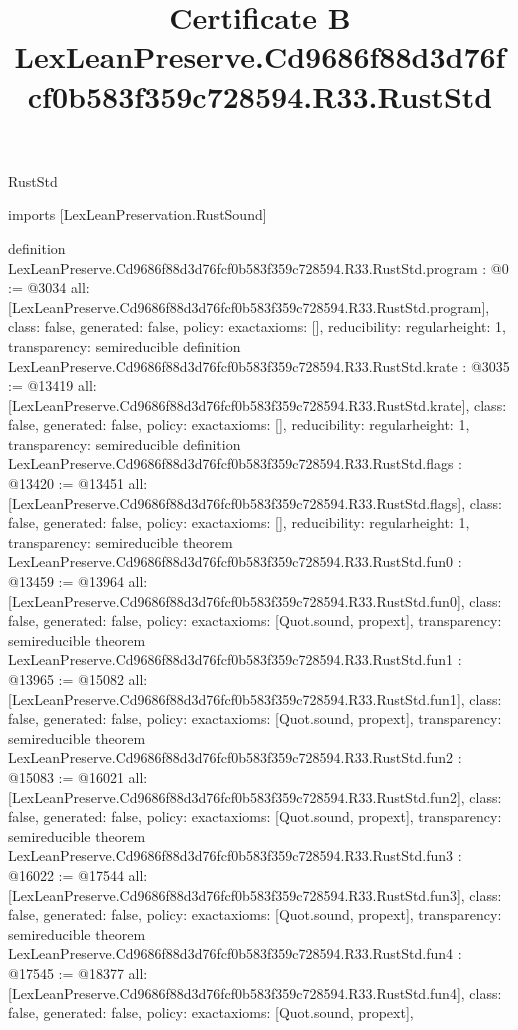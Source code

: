 \begin{lexlean}{RustStd}
\title{Certificate B LexLeanPreserve.Cd9686f88d3d76fcf0b583f359c728594.R33.RustStd}
\begin{coremodule}
imports [LexLeanPreservation.RustSound]

definition LexLeanPreserve.Cd9686f88d3d76fcf0b583f359c728594.R33.RustStd.program : @0 := @3034 {
  all: [LexLeanPreserve.Cd9686f88d3d76fcf0b583f359c728594.R33.RustStd.program],
  class: false,
  generated: false,
  policy: exact{axioms: []},
  reducibility: regular{height: 1},
  transparency: semireducible
}
definition LexLeanPreserve.Cd9686f88d3d76fcf0b583f359c728594.R33.RustStd.krate : @3035 := @13419 {
  all: [LexLeanPreserve.Cd9686f88d3d76fcf0b583f359c728594.R33.RustStd.krate],
  class: false,
  generated: false,
  policy: exact{axioms: []},
  reducibility: regular{height: 1},
  transparency: semireducible
}
definition LexLeanPreserve.Cd9686f88d3d76fcf0b583f359c728594.R33.RustStd.flags : @13420 := @13451 {
  all: [LexLeanPreserve.Cd9686f88d3d76fcf0b583f359c728594.R33.RustStd.flags],
  class: false,
  generated: false,
  policy: exact{axioms: []},
  reducibility: regular{height: 1},
  transparency: semireducible
}
theorem LexLeanPreserve.Cd9686f88d3d76fcf0b583f359c728594.R33.RustStd.fun0 : @13459 := @13964 {
  all: [LexLeanPreserve.Cd9686f88d3d76fcf0b583f359c728594.R33.RustStd.fun0],
  class: false,
  generated: false,
  policy: exact{axioms: [Quot.sound, propext]},
  transparency: semireducible
}
theorem LexLeanPreserve.Cd9686f88d3d76fcf0b583f359c728594.R33.RustStd.fun1 : @13965 := @15082 {
  all: [LexLeanPreserve.Cd9686f88d3d76fcf0b583f359c728594.R33.RustStd.fun1],
  class: false,
  generated: false,
  policy: exact{axioms: [Quot.sound, propext]},
  transparency: semireducible
}
theorem LexLeanPreserve.Cd9686f88d3d76fcf0b583f359c728594.R33.RustStd.fun2 : @15083 := @16021 {
  all: [LexLeanPreserve.Cd9686f88d3d76fcf0b583f359c728594.R33.RustStd.fun2],
  class: false,
  generated: false,
  policy: exact{axioms: [Quot.sound, propext]},
  transparency: semireducible
}
theorem LexLeanPreserve.Cd9686f88d3d76fcf0b583f359c728594.R33.RustStd.fun3 : @16022 := @17544 {
  all: [LexLeanPreserve.Cd9686f88d3d76fcf0b583f359c728594.R33.RustStd.fun3],
  class: false,
  generated: false,
  policy: exact{axioms: [Quot.sound, propext]},
  transparency: semireducible
}
theorem LexLeanPreserve.Cd9686f88d3d76fcf0b583f359c728594.R33.RustStd.fun4 : @17545 := @18377 {
  all: [LexLeanPreserve.Cd9686f88d3d76fcf0b583f359c728594.R33.RustStd.fun4],
  class: false,
  generated: false,
  policy: exact{axioms: [Quot.sound, propext]},
}
\end{coremodule}
\end{lexlean}
